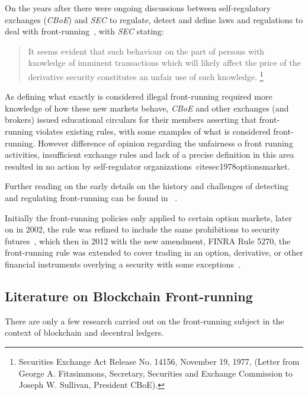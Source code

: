 
On the years after there were ongoing discussions between self-regulatory exchanges (\eg \textit{CBoE}) and  \textit{SEC} to regulate, detect and define laws and regulations to deal with front-running~\cite{markham1988front}, with \textit{SEC} stating: 
\begin{quote}
It seems evident that such behaviour on the part of persons with knowledge of imminent transactions which will likely affect the price of the derivative security constitutes an unfair use of such knowledge. \footnote{Securities Exchange Act Release No. 14156, November 19, 1977, (Letter from George A. Fitzsimmons, Secretary, Securities and Exchange Commission to Joseph W. Sullivan, President  CBoE).}
\end{quote} 

As defining what exactly is considered illegal front-running required more knowledge of how these new markets behave, \textit{CBoE} and other exchanges (and brokers) issued educational circulars for their members asserting that front-running violates existing rules, with some examples of what is considered front-running. However difference of opinion regarding the unfairness o front running activities, insufficient exchange rules and lack of a precise definition in this area resulted in no action by self-regulator organizations~cite{sec1978optionsmarket}. 

Further reading on the early details on the history and challenges of detecting and regulating front-running can be found in~\cite{markham1988front} . %

Initially the front-running policies only applied to certain option markets, later on in 2002, the rule was refined to include the same prohibitions to security futures~\cite{finra_2002}, which then in 2012 with the new amendment, FINRA Rule 5270, the front-running rule was extended to cover trading in an option, derivative, or other financial instruments overlying a security with some exceptions~\cite{sec2012frontrunning, finra_2012}. 


\subsection{Literature on Blockchain Front-running}
There are only a few research carried out on the front-running subject in the context of blockchain and decentral ledgers. \\

